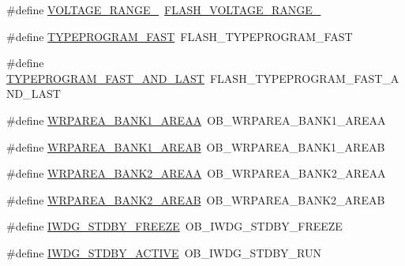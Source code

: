 \begin{DoxyCompactItemize}
\item 
\#define \hyperlink{group___h_a_l___f_l_a_s_h___aliased___defines_ga98497e19f090f03d71a1537fbcfebfe9}{V\+O\+L\+T\+A\+G\+E\+\_\+\+R\+A\+N\+G\+E\+\_}~\hyperlink{group___f_l_a_s_h_ex___voltage___range_gabf8037a482f18815c5a67f287223a658}{F\+L\+A\+S\+H\+\_\+\+V\+O\+L\+T\+A\+G\+E\+\_\+\+R\+A\+N\+G\+E\+\_}
\item 
\#define \hyperlink{group___h_a_l___f_l_a_s_h___aliased___defines_gae3b03b62939464528d8a52b034135ea2}{T\+Y\+P\+E\+P\+R\+O\+G\+R\+A\+M\+\_\+\+F\+A\+ST}~F\+L\+A\+S\+H\+\_\+\+T\+Y\+P\+E\+P\+R\+O\+G\+R\+A\+M\+\_\+\+F\+A\+ST
\item 
\#define \hyperlink{group___h_a_l___f_l_a_s_h___aliased___defines_gab52dbb436e471071f4700f9bafcb0cef}{T\+Y\+P\+E\+P\+R\+O\+G\+R\+A\+M\+\_\+\+F\+A\+S\+T\+\_\+\+A\+N\+D\+\_\+\+L\+A\+ST}~F\+L\+A\+S\+H\+\_\+\+T\+Y\+P\+E\+P\+R\+O\+G\+R\+A\+M\+\_\+\+F\+A\+S\+T\+\_\+\+A\+N\+D\+\_\+\+L\+A\+ST
\item 
\#define \hyperlink{group___h_a_l___f_l_a_s_h___aliased___defines_ga4d57e7a32711f223077cc45a55b4d333}{W\+R\+P\+A\+R\+E\+A\+\_\+\+B\+A\+N\+K1\+\_\+\+A\+R\+E\+AA}~O\+B\+\_\+\+W\+R\+P\+A\+R\+E\+A\+\_\+\+B\+A\+N\+K1\+\_\+\+A\+R\+E\+AA
\item 
\#define \hyperlink{group___h_a_l___f_l_a_s_h___aliased___defines_ga073be154a6602831a813316fa4fb17ca}{W\+R\+P\+A\+R\+E\+A\+\_\+\+B\+A\+N\+K1\+\_\+\+A\+R\+E\+AB}~O\+B\+\_\+\+W\+R\+P\+A\+R\+E\+A\+\_\+\+B\+A\+N\+K1\+\_\+\+A\+R\+E\+AB
\item 
\#define \hyperlink{group___h_a_l___f_l_a_s_h___aliased___defines_ga385f3bbec731cc31de0a8f83943f678c}{W\+R\+P\+A\+R\+E\+A\+\_\+\+B\+A\+N\+K2\+\_\+\+A\+R\+E\+AA}~O\+B\+\_\+\+W\+R\+P\+A\+R\+E\+A\+\_\+\+B\+A\+N\+K2\+\_\+\+A\+R\+E\+AA
\item 
\#define \hyperlink{group___h_a_l___f_l_a_s_h___aliased___defines_gad9e82d85eb324cdc5d4c5071a5b41dc6}{W\+R\+P\+A\+R\+E\+A\+\_\+\+B\+A\+N\+K2\+\_\+\+A\+R\+E\+AB}~O\+B\+\_\+\+W\+R\+P\+A\+R\+E\+A\+\_\+\+B\+A\+N\+K2\+\_\+\+A\+R\+E\+AB
\item 
\#define \hyperlink{group___h_a_l___f_l_a_s_h___aliased___defines_ga29ecb28c7e5de9b73778a4de74cdba4e}{I\+W\+D\+G\+\_\+\+S\+T\+D\+B\+Y\+\_\+\+F\+R\+E\+E\+ZE}~O\+B\+\_\+\+I\+W\+D\+G\+\_\+\+S\+T\+D\+B\+Y\+\_\+\+F\+R\+E\+E\+ZE
\item 
\#define \hyperlink{group___h_a_l___f_l_a_s_h___aliased___defines_ga24bb71bfed2d31ab1c89e2c14617a738}{I\+W\+D\+G\+\_\+\+S\+T\+D\+B\+Y\+\_\+\+A\+C\+T\+I\+VE}~O\+B\+\_\+\+I\+W\+D\+G\+\_\+\+S\+T\+D\+B\+Y\+\_\+\+R\+UN
\item 

\end{DoxyCompactItemize}
